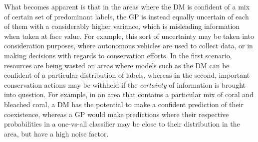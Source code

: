 What becomes apparent is that in the areas where the DM is confident of a mix of certain set of predominant labels, the GP is instead equally uncertain of each of them with a considerably higher variance, which is misleading information when taken at face value. For example, this sort of uncertainty may be taken into consideration purposes, where autonomous vehicles are used to collect data, or in making decisions with regards to conservation efforts. In the first scenario, resources are being wasted on areas where models such as the DM can be confident of a particular distribution of labels, whereas in the second, important conservation actions may be withheld if the \textit{certainty} of information is brought into question. For example, in an area that contains a particular mix of coral and bleached coral, a DM has the potential to make a confident prediction of their coexistence, whereas a GP would make predictions where their respective probabilities in a one-vs-all classifier may be close to their distribution in the area, but have a high noise factor.



